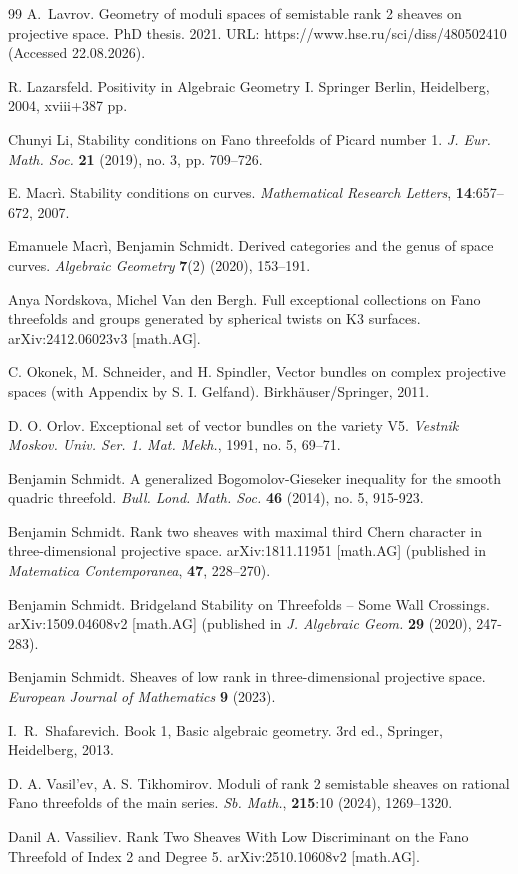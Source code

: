 \documentclass{amsart}
\begin{document}
\begin{thebibliography}{99}
		A.~Lavrov. Geometry of moduli spaces of semistable rank 2 sheaves on projective space. PhD thesis. 2021. URL: https://www.hse.ru/sci/diss/480502410 (Accessed 22.08.2026).
		
		R. Lazarsfeld. Positivity in Algebraic Geometry I. Springer Berlin, Heidelberg, 2004, xviii+387 pp.
		
		Chunyi Li, Stability conditions on Fano threefolds of Picard number 1. \textit{J. Eur. Math. Soc.} \textbf{21} (2019), no. 3, pp. 709–726.
		
		E. Macrì. Stability conditions on curves. \textit{Mathematical Research Letters}, \textbf{14}:657–672, 2007.
		
		Emanuele Macrì, Benjamin Schmidt. Derived categories and the genus of space curves. \textit{Algebraic Geometry} \textbf{7}(2) (2020), 153--191.
		
		Anya Nordskova, Michel Van den Bergh. Full exceptional collections on Fano threefolds and groups generated by spherical twists on K3 surfaces. arXiv:2412.06023v3 [math.AG].
		
		C. Okonek, M. Schneider, and H. Spindler, Vector bundles on complex projective spaces (with Appendix
		by S. I. Gelfand). Birkh\"auser/Springer, 2011.
		
		D. O. Orlov. Exceptional set of vector bundles on the variety V5. \textit{Vestnik Moskov. Univ. Ser. 1. Mat. Mekh.}, 1991, no. 5, 69–71.
		
		Benjamin Schmidt. A generalized Bogomolov-Gieseker inequality for the smooth quadric threefold. \textit{Bull. Lond. Math. Soc.} \textbf{46} (2014), no. 5, 915-923.
		
		Benjamin Schmidt. Rank two sheaves with maximal third Chern character in three-dimensional projective space. arXiv:1811.11951 [math.AG] (published in \textit{Matematica Contemporanea}, \textbf{47}, 228–270).
		
		Benjamin Schmidt. Bridgeland Stability on Threefolds -- Some Wall Crossings. arXiv:1509.04608v2 [math.AG] (published in \textit{J. Algebraic Geom.} \textbf{29} (2020), 247-283).
		
		Benjamin Schmidt. Sheaves of low rank in three-dimensional projective space. \textit{European Journal of Mathematics} \textbf{9} (2023).
		
		I.~R.~Shafarevich. Book 1, Basic algebraic geometry. 3rd ed., 
		Springer, Heidelberg, 2013.
		
		D. A. Vasil'ev, A. S. Tikhomirov. Moduli of rank 2 semistable sheaves on rational Fano threefolds of the main series. \textit{Sb. Math.}, \textbf{215}:10 (2024), 1269–1320.
		
		Danil A. Vassiliev. Rank Two Sheaves With Low Discriminant on the Fano Threefold of Index 2 and Degree 5. arXiv:2510.10608v2 [math.AG].
		
	\end{thebibliography}
	
\end{document}
